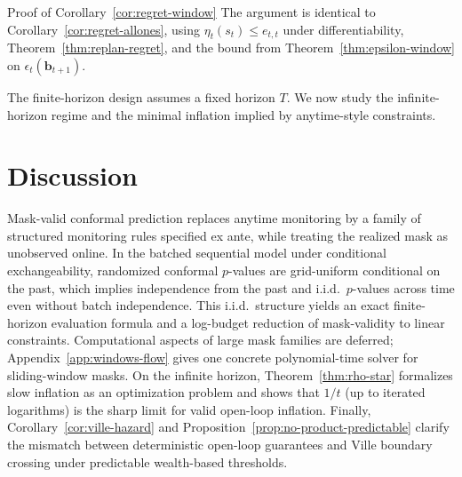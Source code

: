 \documentclass{uai2026} %
\newcommand{\1}{\mathbf{1}}
\newcommand{\mcal}{\mathcal{M}}
\begin{document}
\begin{appendixproof}{Proof of Corollary~\ref{cor:regret-window}}
  The argument is identical to Corollary~\ref{cor:regret-allones}, using $\eta_t(s_t)\le e_{t,t}$ under differentiability, Theorem~\ref{thm:replan-regret}, and the bound from Theorem~\ref{thm:epsilon-window} on $\epsilon_t(\mathbf{b}_{t+1})$.
\end{appendixproof}

The finite-horizon design assumes a fixed horizon $T$.
We now study the infinite-horizon regime and the minimal inflation implied by anytime-style constraints.


\section{Discussion}
Mask-valid conformal prediction replaces anytime monitoring by a family of structured monitoring rules specified ex ante, while treating the realized mask as unobserved online.
In the batched sequential model under conditional exchangeability, randomized conformal $p$-values are grid-uniform conditional on the past, which implies independence from the past and i.i.d.\ $p$-values across time even without batch independence.
This i.i.d.\ structure yields an exact finite-horizon evaluation formula and a log-budget reduction of mask-validity to linear constraints.
Computational aspects of large mask families are deferred; Appendix~\ref{app:windows-flow} gives one concrete polynomial-time solver for sliding-window masks.
On the infinite horizon, Theorem~\ref{thm:rho-star} formalizes slow inflation as an optimization problem and shows that $1/t$ (up to iterated logarithms) is the sharp limit for valid open-loop inflation.
Finally, Corollary~\ref{cor:ville-hazard} and Proposition~\ref{prop:no-product-predictable} clarify the mismatch between deterministic open-loop guarantees and Ville boundary crossing under predictable wealth-based thresholds.


\appendix
\onecolumn

\end{document}
